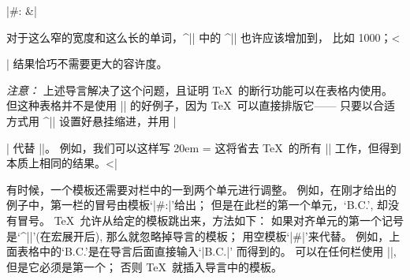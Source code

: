 {{\answer |\hfil#: &\cr|\par\nobreak\medskip\noindent
对于这么窄的宽度和这么长的单词，^|\vtop| 中的 ^|\tolerance| 也许应该增加到，
比如 1000；^^|\strut| 结果恰巧不需要更大的容许度。\par
{\sl 注意：\/} 上述导言解决了这个问题，且证明 \TeX\ 的断行功能可以在表格内使用。
但这种表格并不是使用 |\halign| 的好例子，因为 \TeX\ 可以直接排版它——
只要以合适方式用 ^|\everypar| 设置好悬挂缩进，并用 |\par| 代替 |\cr|。
例如，我们可以这样写
\begintt
\hsize20em \parindent0pt  
\def\history#1&{\hangindent4.5em
  \hbox to4em{\hss#1: }\ignorespaces}
\everypar={\history} \def\\{\leavevmode{\it c\/}}
\endtt
这将省去 \TeX\ 的所有 |\halign| 工作，但得到本质上相同的结果。^^|\leavevmode|

\danger \1有时候，一个模板还需要对栏中的一到两个单元进行调整。%
例如，在刚才给出的例子中，第一栏的冒号由模板`|\hfil#:|\]'给出；
但是在此栏的第一个单元，`{\sevenrm B.C.}', 却没有冒号。%
 \TeX\ 允许从给定的模板跳出来，方法如下：
如果对齐单元的第一个记号是`^|\omit|'(在宏展开后),
那么就忽略掉导言的模板；
用空模板`|#|'来代替。%
例如，上面表格中的`{\sevenrm B.C.}'是在导言后面直接输入`|\omit\hfil\sevenrm B.C.|'%
而得到的。%
可以在任何栏使用 |\omit|, 但是它必须是第一个；
否则 \TeX\ 就插入导言中的模板。

}}
